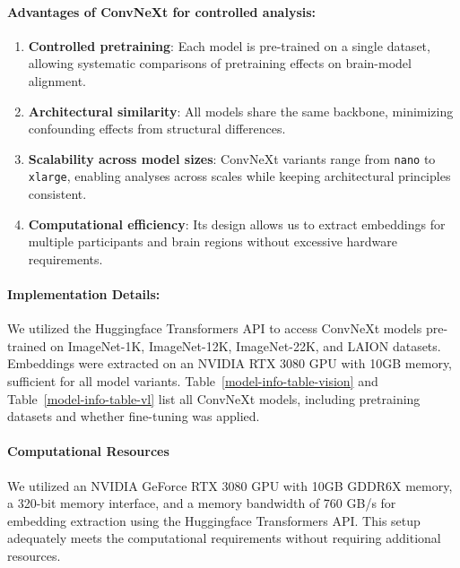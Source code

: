 \documentclass{article}
\theoremstyle{plain}
\theoremstyle{definition}
\theoremstyle{remark}
\begin{document}
\paragraph{Advantages of ConvNeXt for controlled analysis:}  
\begin{enumerate}
    \item \textbf{Controlled pretraining}: Each model is pre-trained on a single dataset, allowing systematic comparisons of pretraining effects on brain-model alignment.
    \item \textbf{Architectural similarity}: All models share the same backbone, minimizing confounding effects from structural differences.
    \item \textbf{Scalability across model sizes}: ConvNeXt variants range from \texttt{nano} to \texttt{xlarge}, enabling analyses across scales while keeping architectural principles consistent.
    \item \textbf{Computational efficiency}: Its design allows us to extract embeddings for multiple participants and brain regions without excessive hardware requirements.
\end{enumerate}


\paragraph{Implementation Details:}  
We utilized the Huggingface Transformers API to access ConvNeXt models pre-trained on ImageNet-1K, ImageNet-12K, ImageNet-22K, and LAION datasets. Embeddings were extracted on an NVIDIA RTX 3080 GPU with 10GB memory, sufficient for all model variants. Table~\ref{model-info-table-vision} and Table~\ref{model-info-table-vl} list all ConvNeXt models, including pretraining datasets and whether fine-tuning was applied.


\paragraph{Computational Resources}  
We utilized an NVIDIA GeForce RTX 3080 GPU with 10GB GDDR6X memory, a 320-bit memory interface, and a memory bandwidth of 760 GB/s for embedding extraction using the Huggingface Transformers API. This setup adequately meets the computational requirements without requiring additional resources.


\end{document}

